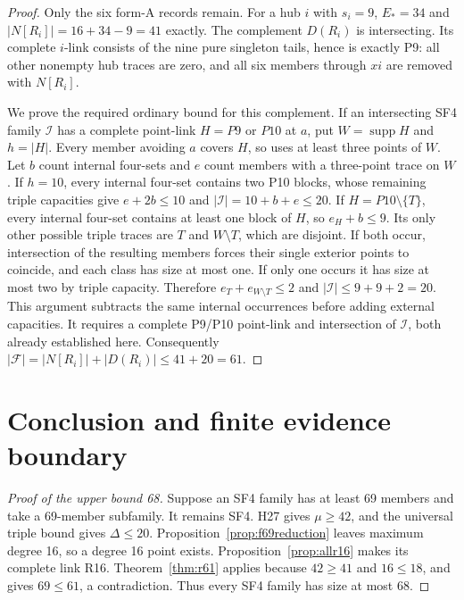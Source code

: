 \documentclass[11pt,a4paper]{article}
\numberwithin{equation}{section}
\theoremstyle{remark}
\newcommand{\F}{\mathcal F}
\begin{document}
\begin{proof}
Only the six form-A records remain. For a hub $ i $ with $ s_i=9$,
$ E_*=34$ and $|N[R_i]|=16+34-9=41$ exactly. The complement $ D(R_i)$
is intersecting. Its complete $ i $-link consists of the nine pure
singleton tails, hence is exactly P9: all other nonempty hub traces
are zero, and all six members through $ xi $ are removed with $ N[R_i]$.

We prove the required ordinary bound for this complement. If an
intersecting SF4 family $\mathcal I $ has a complete point-link $ H=P9$
or $ P10$ at $ a $, put $ W=\operatorname{supp}H $ and $ h=|H|$.
Every member avoiding $ a $ covers $ H $, so uses at least three points of $ W $.
Let $ b $ count internal four-sets and $ e $ count members with a three-point
trace on $ W $. If $ h=10$, every internal four-set contains two P10
blocks, whose remaining triple capacities give $ e+2b\le 10$ and
$|\mathcal I|=10+b+e\le 20$. If $ H=P10\setminus\{T\}$,
every internal four-set contains at least one block of $ H $, so
$ e_H+b\le 9$. Its only other possible triple traces are $ T $ and
$ W\setminus T $, which are disjoint. If both occur, intersection of
the resulting members forces their single exterior points to coincide,
and each class has size at most one. If only one occurs it has size at
most two by triple capacity. Therefore $ e_T+e_{W\setminus T}\le 2$
and $|\mathcal I|\le 9+9+2=20$.
This argument subtracts the same internal occurrences before adding
external capacities. It requires a complete P9/P10 point-link and
intersection of $\mathcal I $, both already established here.
Consequently $|\F|=|N[R_i]|+|D(R_i)|\le 41+20=61$.
\end{proof}

\section{Conclusion and finite evidence boundary}
\label{sec:terminalconclusion}

\begin{proof}[Proof of the upper bound 68]
Suppose an SF4 family has at least 69 members and take a 69-member
subfamily. It remains SF4. H27 gives $\mu\ge 42$, and the universal
triple bound gives $\Delta\le 20$. Proposition~\ref{prop:f69reduction}
leaves maximum degree 16, so a degree 16 point exists.
Proposition~\ref{prop:allr16} makes its complete link R16.
Theorem~\ref{thm:r61} applies because $42\ge 41$ and $16\le 18$, and
gives $69\le 61$, a contradiction. Thus every SF4 family has size at most 68.
\end{proof}
\end{document}
